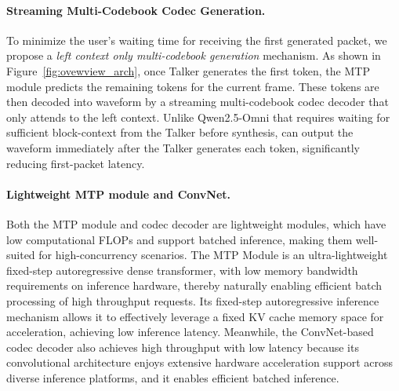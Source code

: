 \paragraph{Streaming Multi-Codebook Codec Generation.} To minimize the user's waiting time for receiving the first generated packet, we propose a \textit{left context only multi-codebook generation} mechanism. As shown in Figure~\ref{fig:ovewview_arch}, once Talker generates the first token, the MTP module predicts the remaining tokens for the current frame. These tokens are then decoded into waveform by a streaming multi-codebook codec decoder that only attends to the left context. Unlike Qwen2.5-Omni that requires waiting for sufficient block-context from the Talker before synthesis, \method can output the waveform immediately after the Talker generates each token, significantly reducing first-packet latency. 

\paragraph{Lightweight MTP module and ConvNet.} Both the MTP module and codec decoder are lightweight modules, which have low computational FLOPs and support batched inference, making them well-suited for high-concurrency scenarios. The MTP Module is an ultra-lightweight fixed-step autoregressive dense transformer, with low memory bandwidth requirements on inference hardware, thereby naturally enabling efficient batch processing of high throughput requests. Its fixed-step autoregressive inference mechanism allows it to effectively leverage a fixed KV cache memory space for acceleration, achieving low inference latency. Meanwhile, the ConvNet-based codec decoder also achieves high throughput with low latency because its convolutional architecture enjoys extensive hardware acceleration support across diverse inference platforms, and it enables efficient batched inference.


